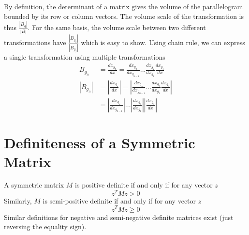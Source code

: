 \documentclass{book}
\numberwithin{equation}{subsection}
\begin{document}
By definition, the determinant of a matrix gives the volume of the parallelogram bounded by its row or column vectors. The volume scale of the transformation is thus $\frac{|B_g|}{|B|}$. For the same basis, the volume scale between two different transformations have $\frac{|B_{g_1}|}{|B_{g_2}|}$ which is easy to show. Using chain rule, we can express a single transformation using multiple transformations
\begin{align}
    B_{g_n} &= \frac{dx_{g_n}}{dx} = \frac{dx_{g_n}}{dx_{g_{n-1}}}...\frac{dx_{g_2}}{dx_{g_1}}\frac{dx_{g_1}}{dx}\\
    |B_{g_n}| &= |\frac{dx_{g_n}}{dx}| = |\frac{dx_{g_n}}{dx_{g_{n-1}}}...\frac{dx_{g_2}}{dx_{g_1}}\frac{dx_{g_1}}{dx}|\\
    &= |\frac{dx_{g_n}}{dx_{g_{n-1}}}|...|\frac{dx_{g_2}}{dx_{g_1}}||\frac{dx_{g_1}}{dx}|
\end{align}
\section{Definiteness of a Symmetric Matrix}
A symmetric matrix $M$ is positive definite if and only if for any vector $z$
\begin{equation}
    z^TMz > 0
\end{equation}
Similarly, $M$ is semi-positive definite if and only if for any vector $z$
\begin{equation}
    z^TMz \geq 0
\end{equation}
Similar definitions for negative and semi-negative definite matrices exist (just reversing the equality sign).
\end{document}
